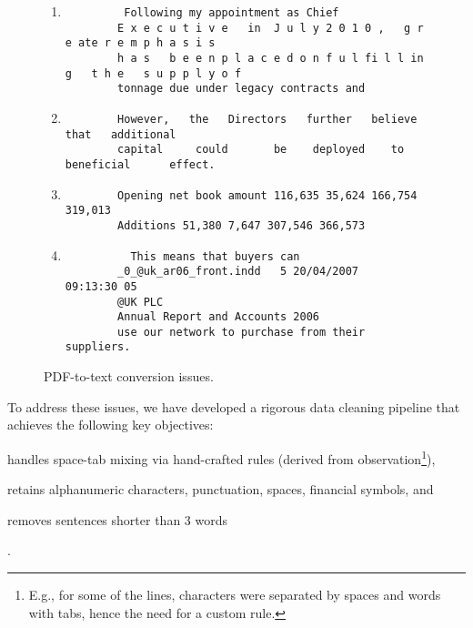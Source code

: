 \begin{figure}[ht]
    \centering
    \begin{enumerate}
        \item \begin{verbatim}
         Following my appointment as Chief
        E x e c u t i v e	in	J u l y	2 0 1 0 ,	g r e ate r	e m p h a s i s
        h a s	b e e n	p l a c e d	o n	f u l fi l l in g	t h e	s u p p l y	o f
        tonnage due under legacy contracts and
    \end{verbatim}
    \item \begin{verbatim}
        However,   the   Directors   further   believe   that   additional
        capital   	could   	be	  deployed	  to 	beneficial   	effect.
    \end{verbatim}
    \item \begin{verbatim}
        Opening net book amount 116,635 35,624 166,754 319,013
        Additions 51,380 7,647 307,546 366,573
    \end{verbatim}
    \item \begin{verbatim}
          This means that buyers can
        _0_@uk_ar06_front.indd   5 20/04/2007   09:13:30 05
        @UK PLC
        Annual Report and Accounts 2006
        use our network to purchase from their suppliers.
    \end{verbatim}
    \end{enumerate}
    \caption{PDF-to-text conversion issues.}
    \label{fig:pdf_to_text}
\end{figure}

To address these issues, we have developed a rigorous data cleaning pipeline that achieves the following key objectives:
\begin{enumerate*}[label=(\alph*)]
    \item handles space-tab mixing via hand-crafted rules (derived from observation\footnote{
      E.g., for some of the lines, characters were separated by spaces and words with tabs, hence the need for a custom rule.
    }),
    \item retains alphanumeric characters, punctuation, spaces, financial symbols, and
    \item removes sentences shorter than 3 words
\end{enumerate*}.

